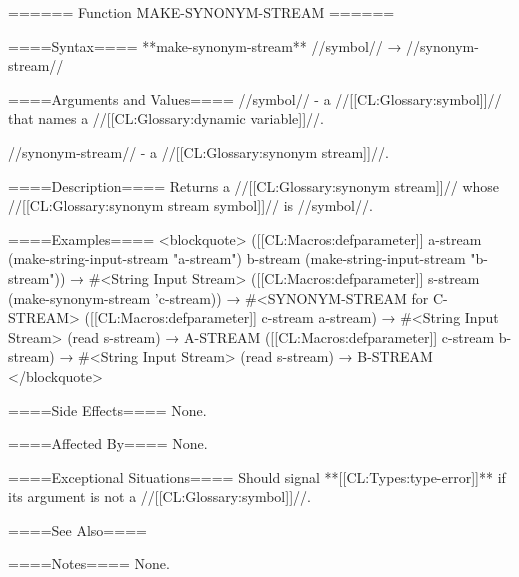 ====== Function MAKE-SYNONYM-STREAM ======

====Syntax====
**make-synonym-stream** //symbol// → //synonym-stream//

====Arguments and Values====
//symbol// - a //[[CL:Glossary:symbol]]// that names a //[[CL:Glossary:dynamic variable]]//.

//synonym-stream// - a //[[CL:Glossary:synonym stream]]//.

====Description====
Returns a //[[CL:Glossary:synonym stream]]// whose //[[CL:Glossary:synonym stream symbol]]// is //symbol//.

====Examples====
<blockquote> ([[CL:Macros:defparameter]] a-stream (make-string-input-stream "a-stream") b-stream (make-string-input-stream "b-stream")) → #<String Input Stream> ([[CL:Macros:defparameter]] s-stream (make-synonym-stream 'c-stream)) → #<SYNONYM-STREAM for C-STREAM> ([[CL:Macros:defparameter]] c-stream a-stream) → #<String Input Stream> (read s-stream) → A-STREAM ([[CL:Macros:defparameter]] c-stream b-stream) → #<String Input Stream> (read s-stream) → B-STREAM </blockquote>

====Side Effects====
None.

====Affected By====
None.

====Exceptional Situations====
Should signal **[[CL:Types:type-error]]** if its argument is not a //[[CL:Glossary:symbol]]//.

====See Also====
{\secref\StreamConcepts}

====Notes====
None.

